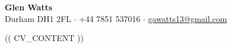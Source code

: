 \documentclass[10pt,a4paper]{article}
\begin{document}
\begin{center}
    {\huge \bfseries Glen Watts} \\
    Durham DH1 2FL $\cdot$ +44 7851 537016 $\cdot$ \href{mailto:gawatts13@gmail.com}{gawatts13@gmail.com}
\end{center}

(( CV_CONTENT ))
\end{document}
